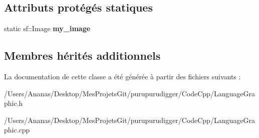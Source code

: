 \subsection*{Attributs protégés statiques}
\begin{DoxyCompactItemize}
\item 
\hypertarget{class_language_graphic_a54664ca1c39562c8e506ba7873d6ad05}{static sf\-::\-Image {\bfseries my\-\_\-image}}\label{class_language_graphic_a54664ca1c39562c8e506ba7873d6ad05}

\end{DoxyCompactItemize}
\subsection*{Membres hérités additionnels}


La documentation de cette classe a été générée à partir des fichiers suivants \-:\begin{DoxyCompactItemize}
\item 
/\-Users/\-Ananas/\-Desktop/\-Mes\-Projets\-Git/purupurudigger/\-Code\-Cpp/Language\-Graphic.\-h\item 
/\-Users/\-Ananas/\-Desktop/\-Mes\-Projets\-Git/purupurudigger/\-Code\-Cpp/Language\-Graphic.\-cpp\end{DoxyCompactItemize}
